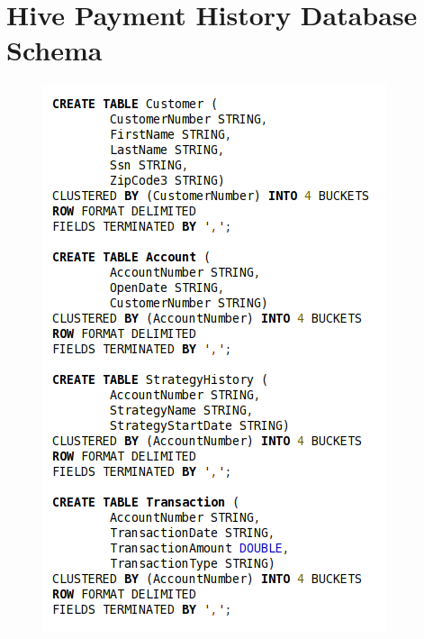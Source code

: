 %
%
\chapter{Hive Payment History Database Schema} \label{app:hive}
\begin{figure}[hct]
 \centering
 \includegraphics[scale=0.90]{../images/hive_payment_schema.png}
\end{figure}

